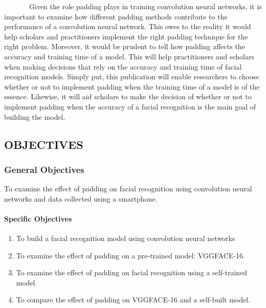\documentclass[
  12pt,
]{article}
\providecommand{\tightlist}{%
  \setlength{\itemsep}{0pt}\setlength{\parskip}{0pt}}
\begin{document}
~~~~~~~Given the role padding plays in training convolution neural
networks, it is important to examine how different padding methods
contribute to the performance of a convolution neural network. This owes
to the reality it would help scholars and practitioners implement the
right padding technique for the right problem. Moreover, it would be
prudent to tell how padding affects the accuracy and training time of a
model. This will help practitioners and scholars when making decisions
that rely on the accuracy and training time of facial recognition
models. Simply put, this publication will enable researchers to choose
whether or not to implement padding when the training time of a model is
of the essence. Likewise, it will aid scholars to make the decision of
whether or not to implement padding when the accuracy of a facial
recognition is the main goal of building the model.

\subsection{OBJECTIVES}\label{objectives}

\subsubsection{General Objectives}\label{general-objectives}

To examine the effect of padding on facial recognition using convolution
neural networks and data collected using a smartphone.

\paragraph{Specific Objectives}\label{specific-objectives}

\begin{enumerate}
\def\labelenumi{\arabic{enumi}.}
\tightlist
\item
  To build a facial recognition model using convolution neural networks
\item
  To examine the effect of padding on a pre-trained model: VGGFACE-16.
\item
  To examine the effect of padding on facial recognition using a
  self-trained model
\item
  To compare the effect of padding on VGGFACE-16 and a self-built model.
\end{enumerate}

\newpage
\doublespacing
\large
\justifying
\end{document}
